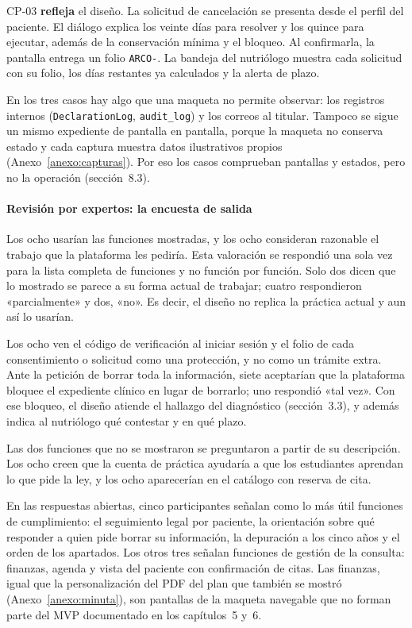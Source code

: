 \documentclass[12pt, a4paper]{article}
\begin{document}
CP-03 \textbf{refleja} el diseño. La solicitud de cancelación se
presenta desde el perfil del paciente. El diálogo explica los veinte
días para resolver y los quince para ejecutar, además de la conservación
mínima y el bloqueo. Al confirmarla, la pantalla entrega un folio
\texttt{ARCO-}. La bandeja del nutriólogo muestra cada solicitud con su
folio, los días restantes ya calculados y la alerta de plazo.

En los tres casos hay algo que una maqueta no permite observar: los
registros internos (\texttt{DeclarationLog}, \texttt{audit\_log}) y los
correos al titular. Tampoco se sigue un mismo expediente de pantalla en
pantalla, porque la maqueta no conserva estado y cada captura muestra
datos ilustrativos propios (Anexo~\ref{anexo:capturas}). Por eso los
casos comprueban pantallas y estados, pero no la operación
(sección~8.3).

\paragraph{Revisión por expertos: la encuesta de salida}
Los ocho usarían las funciones mostradas, y los ocho consideran
razonable el trabajo que la plataforma les pediría. Esta valoración se
respondió una sola vez para la lista completa de funciones y no función
por función. Solo dos dicen que lo mostrado se parece a su forma actual
de trabajar; cuatro respondieron «parcialmente» y dos, «no». Es decir,
el diseño no replica la práctica actual y aun así lo usarían.

Los ocho ven el código de verificación al iniciar sesión y el folio de
cada consentimiento o solicitud como una protección, y no como un
trámite extra. Ante la petición de borrar toda la información, siete
aceptarían que la plataforma bloquee el expediente clínico en lugar de
borrarlo; uno respondió «tal vez». Con ese bloqueo, el diseño atiende el
hallazgo del diagnóstico (sección~3.3), y además indica al nutriólogo
qué contestar y en qué plazo.

Las dos funciones que no se mostraron se preguntaron a partir de su
descripción. Los ocho creen que la cuenta de práctica ayudaría a que los
estudiantes aprendan lo que pide la ley, y los ocho aparecerían en el
catálogo con reserva de cita.

En las respuestas abiertas, cinco participantes señalan como lo más útil
funciones de cumplimiento: el seguimiento legal por paciente, la
orientación sobre qué responder a quien pide borrar su información, la
depuración a los cinco años y el orden de los apartados. Los otros tres
señalan funciones de gestión de la consulta: finanzas, agenda y vista
del paciente con confirmación de citas. Las finanzas, igual que la
personalización del PDF del plan que también se mostró
(Anexo~\ref{anexo:minuta}), son pantallas de la maqueta navegable que
no forman parte del MVP documentado en los capítulos~5 y~6.
\end{document}
